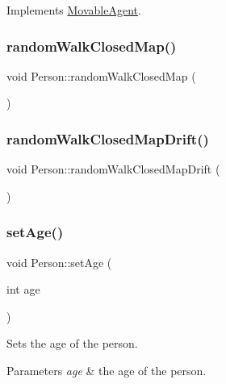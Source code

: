 Implements \mbox{\hyperlink{class_movable_agent_a35299e133c6787689b553d74ce5f98f0}{Movable\+Agent}}.

\mbox{\label{class_person_a92afed7b9c170806afe8cfe0d46af6af}} 
\subsubsection{\texorpdfstring{randomWalkClosedMap()}{randomWalkClosedMap()}}
{\footnotesize\ttfamily void Person\+::random\+Walk\+Closed\+Map (\begin{DoxyParamCaption}{ }\end{DoxyParamCaption})\hspace{0.3cm}{\ttfamily [private]}}

\mbox{\label{class_person_a43353854c1f8800cb5575d2cab71d720}} 
\subsubsection{\texorpdfstring{randomWalkClosedMapDrift()}{randomWalkClosedMapDrift()}}
{\footnotesize\ttfamily void Person\+::random\+Walk\+Closed\+Map\+Drift (\begin{DoxyParamCaption}{ }\end{DoxyParamCaption})\hspace{0.3cm}{\ttfamily [private]}}

\mbox{\label{class_person_ac8ade54c27a0657c987c395ff04a9d46}} 
\subsubsection{\texorpdfstring{setAge()}{setAge()}}
{\footnotesize\ttfamily void Person\+::set\+Age (\begin{DoxyParamCaption}\item[{int}]{age }\end{DoxyParamCaption})}

Sets the age of the person. 
\begin{DoxyParams}{Parameters}
{\em age} & the age of the person. \\
\hline
\end{DoxyParams}
\mbox{\label{class_person_a05f4ac2107d59e03f0f336eda08aa358}} 
